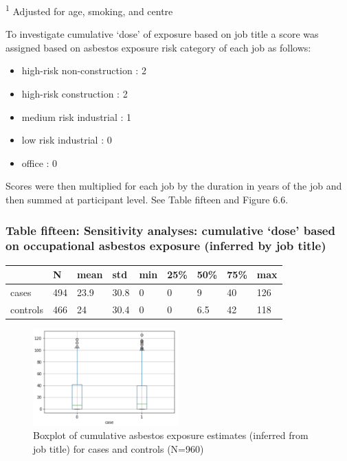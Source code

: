 \documentclass[
]{article}
\providecommand{\tightlist}{%
  \setlength{\itemsep}{0pt}\setlength{\parskip}{0pt}}
\begin{document}
\textsuperscript{1} Adjusted for age, smoking, and centre

To investigate cumulative `dose' of exposure based on job title a score
was assigned based on asbestos exposure risk category of each job as
follows:

\begin{itemize}
\tightlist
\item
  high-risk non-construction : 2
\item
  high-risk construction : 2
\item
  medium risk industrial : 1
\item
  low risk industrial : 0
\item
  office : 0
\end{itemize}

Scores were then multiplied for each job by the duration in years of the
job and then summed at participant level. See Table fifteen and Figure
6.6.

\hypertarget{table-fifteen-sensitivity-analyses-cumulative-dose-based-on-occupational-asbestos-exposure-inferred-by-job-title}{%
\subsubsection{Table fifteen: Sensitivity analyses: cumulative `dose'
based on occupational asbestos exposure (inferred by job
title)}\label{table-fifteen-sensitivity-analyses-cumulative-dose-based-on-occupational-asbestos-exposure-inferred-by-job-title}}

\begin{longtable}[]{@{}lllllllll@{}}
\toprule
& N & mean & std & min & 25\% & 50\% & 75\% & max\tabularnewline
\midrule
\endhead
cases & 494 & 23.9 & 30.8 & 0 & 0 & 9 & 40 & 126\tabularnewline
controls & 466 & 24 & 30.4 & 0 & 0 & 6.5 & 42 & 118\tabularnewline
\bottomrule
\end{longtable}

\begin{figure}
\centering
\includegraphics[width=0.5\textwidth,height=\textheight]{source/figures/dose.png}
\caption{Boxplot of cumulative asbestos exposure estimates (inferred
from job title) for cases and controls (N=960)}
\end{figure}
\end{document}
